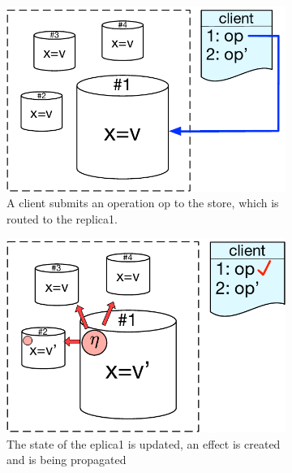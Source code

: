 \begin{figure}[t]
    \centering
    \begin{subfigure}[t]{0.31\textwidth}
    \centering
        \includegraphics[scale=0.32]{Figures/system_model1.pdf}
        \caption{\scriptsize A client submits an operation op to the store, which
	is routed to the replica1.}
        \label{fig:sys_model1}
    \end{subfigure}
    \hfill
    \begin{subfigure}[t]{0.31\textwidth}
        \centering
	\includegraphics[scale=0.32]{Figures/system_model2.pdf}
        \caption{\scriptsize The state of the eplica1 is updated, an
	effect is created and is being propagated}
        \label{fig:sys_model2}
    \end{subfigure}
    \hfill
    \begin{subfigure}[t]{0.31\textwidth}
        \centering

\end{subfigure}
\end{figure}
